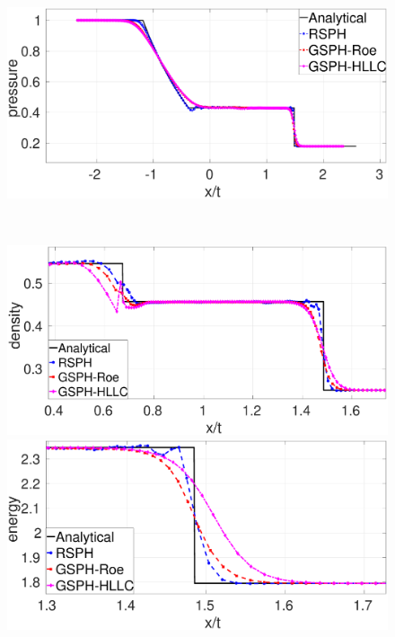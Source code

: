 \begin{figure}[htp]
\begin{minipage}{.495\textwidth}
    \end{minipage}%
    \begin{minipage}{.495 \textwidth}
        \centering
        \includegraphics[width=0.99 \textwidth]{Chapter-4/Figures/Sod/RCM-Sod-GSPH-compare-p}
    \end{minipage}%
    \\
    \begin{minipage}{.495\textwidth}
        \centering
        \includegraphics[width=0.99 \textwidth]{Chapter-4/Figures/Sod/RCM-Sod-GSPH-compare-rho-zoom}
    \end{minipage}%
    \begin{minipage}{.495 \textwidth}
        \centering
        \includegraphics[width=0.99 \textwidth]{Chapter-4/Figures/Sod/RCM-Sod-GSPH-compare-e-zoom}

\end{minipage}
\end{figure}
